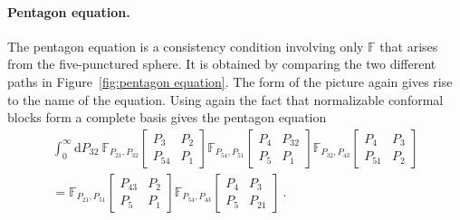 \documentclass[12pt,a4paper]{article}
\renewcommand\d{\text{d}}
\begin{document}
\paragraph{Pentagon equation.}
The pentagon equation is a consistency condition involving only $\mathbb{F}$ that arises from the five-punctured sphere. It is obtained by comparing the two different paths in Figure~\ref{fig:pentagon equation}. The form of the picture again gives rise to the name of the equation. Using again the fact that normalizable conformal blocks form a complete basis gives the pentagon equation
        \begin{multline}
        \int_0^\infty\!\!  \d P_{32}\ \mathbb{F}_{P_{21},P_{32}} \!\begin{bmatrix}
            P_3 & P_2 \\
            P_{54} & P_1
        \end{bmatrix}
        \mathbb{F}_{P_{54},P_{51}} \!\begin{bmatrix}
            P_4 & P_{32} \\
            P_5 & P_1
        \end{bmatrix}
        \mathbb{F}_{P_{32},P_{43}} \!\begin{bmatrix}
            P_4 & P_3 \\
            P_{51} & P_2
        \end{bmatrix} \\
        =
        \mathbb{F}_{P_{21},P_{51}} \!\begin{bmatrix}
            P_{43} & P_2 \\
            P_5 & P_1
        \end{bmatrix}
        \mathbb{F}_{P_{54},P_{43}} \!\begin{bmatrix}
            P_4 & P_3 \\
            P_5 & P_{21}
        \end{bmatrix}\ . \label{eq:g=0, n=5 pentagon equation}
        \end{multline}
\end{document}
